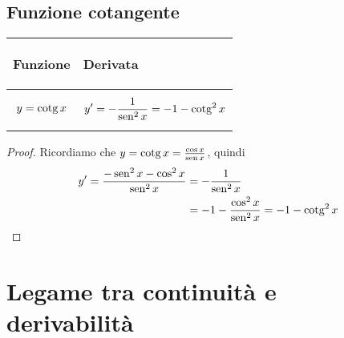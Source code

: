 \subsection{Funzione cotangente}
\begin{center}
    \begin{tabular}{m{}|m{}}
        \begin{center}
            \textbf{Funzione}
        \end{center}
        & 
        \begin{center}
            \textbf{Derivata}
        \end{center}\\
        \hline
            \[y=\operatorname{cotg} x\] &
            \[y'=-\frac{1}{\operatorname{sen}^2x}=-1-\operatorname{cotg}^2x\]
    \end{tabular}
\end{center}
    \begin{proof}
        Ricordiamo che $y=\operatorname{cotg} x =\frac{\cos x}{\operatorname{sen} x}$, quindi 
        \[\begin{aligned}
            y'=\frac{-\operatorname{sen}^2 x-\cos^2 x}{\operatorname{sen}^2 x} &= -\frac{1}{\operatorname{sen}^2 x}\\
                                                  &= -1- \frac{\cos^2x}{\operatorname{sen}^2x }= -1-\operatorname{cotg}^2x 
        \end{aligned}\]
    \end{proof}
\section{Legame tra continuità e derivabilità}

